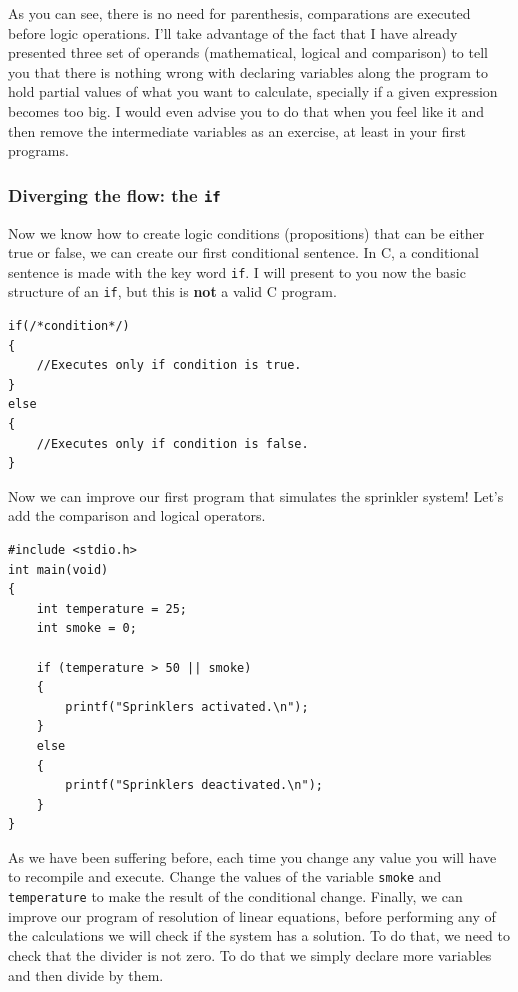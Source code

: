 \documentclass[a4paper]{article}
\begin{document}
As you can see, there is no need for parenthesis, comparations are executed
before logic operations. I'll take advantage of the fact that I have already
presented three set of operands (mathematical, logical and comparison) to tell
you that there is nothing wrong with declaring variables along the program
to hold partial values of what you want to calculate, specially if a given
expression becomes too big. I would even advise you to do that when you feel
like it and then remove the intermediate variables as an exercise, at least in
your first programs.

\subsubsection{Diverging the flow: the \texttt{if}}
Now we know how to create logic conditions (propositions) that can be either
true or false, we can create our first conditional sentence. In C, a conditional
sentence is made with the key word \lstinline[style=C]!if!. I will present to
you now the basic structure of an \texttt{if}, but this is \textbf{not} a
valid C program.

\noindent
\begin{minipage}[H]{\linewidth}
\mbox{}
\begin{lstlisting}[style=C,
caption={Basic structure of \texttt{if} sentence},
label={lst:ifStructure}]
if(/*condition*/)
{
    //Executes only if condition is true.
}
else
{
    //Executes only if condition is false.
}
\end{lstlisting}
\end{minipage}

Now we can improve our first program that simulates the sprinkler system!
Let's add the comparison and logical operators.

\noindent
\begin{minipage}[H]{\linewidth}
\mbox{}
\begin{lstlisting}[style=C,
caption={Fire sprinkler program with logic and comparison operators},
label={lst:sprinklerLogicComp}]
#include <stdio.h>
int main(void)
{
    int temperature = 25;
    int smoke = 0;

    if (temperature > 50 || smoke)
    {
        printf("Sprinklers activated.\n");
    }
    else
    {
        printf("Sprinklers deactivated.\n");
    }
}
\end{lstlisting}
\end{minipage}

As we have been suffering before, each time you change any value you will have
to recompile and execute. Change the values of the variable \texttt{smoke} and
\texttt{temperature} to make the result of the conditional change. Finally,
we can improve our program of resolution of linear equations, before performing
any of the calculations we will check if the system has a solution. To do that,
we need to check that the divider is not zero. To do that we simply declare more
variables and then divide by them.
\end{document}
